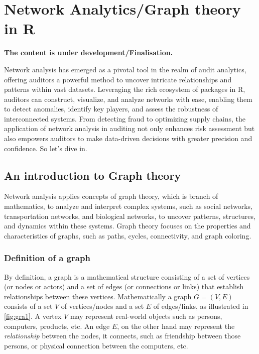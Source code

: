 \documentclass[
]{book}
\begin{document}
\hypertarget{network-analyticsgraph-theory-in-r}{%
\chapter{Network Analytics/Graph theory in R}\label{network-analyticsgraph-theory-in-r}}

\textbf{The content is under development/Finalisation.}

Network analysis has emerged as a pivotal tool in the realm of audit analytics, offering auditors a powerful method to uncover intricate relationships and patterns within vast datasets. Leveraging the rich ecosystem of packages in R, auditors can construct, visualize, and analyze networks with ease, enabling them to detect anomalies, identify key players, and assess the robustness of interconnected systems. From detecting fraud to optimizing supply chains, the application of network analysis in auditing not only enhances risk assessment but also empowers auditors to make data-driven decisions with greater precision and confidence. So let's dive in.

\hypertarget{an-introduction-to-graph-theory}{%
\section{An introduction to Graph theory}\label{an-introduction-to-graph-theory}}

Network analysis applies concepts of graph theory, which is branch of mathematics, to analyze and interpret complex systems, such as social networks, transportation networks, and biological networks, to uncover patterns, structures, and dynamics within these systems. Graph theory focuses on the properties and characteristics of graphs, such as paths, cycles, connectivity, and graph coloring.

\hypertarget{definition-of-a-graph}{%
\subsection{Definition of a graph}\label{definition-of-a-graph}}

By definition, a graph is a mathematical structure consisting of a set of vertices (or nodes or actors) and a set of edges (or connections or links) that establish relationships between these vertices. Mathematically a graph \(G = (V, E)\) consists of a set \(V\) of vertices/nodes and a set \(E\) of edges/links, as illustrated in \ref{fig:gra1}. A vertex \(V\) may represent real-world objects such as persons, computers, products, etc. An edge \(E\), on the other hand may represent the \emph{relationship} between the nodes, it connects, such as friendship between those persons, or physical connection between the computers, etc.
\end{document}
